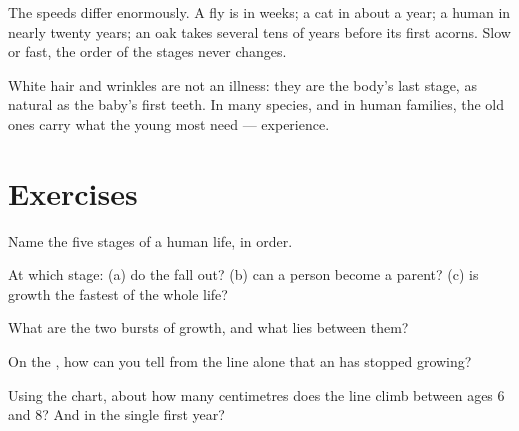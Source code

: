 \begin{example}\label{ex:g3:stages-of-life:speeds}
The speeds differ enormously. A fly is  in weeks; a cat in
about a year; a human in nearly twenty years; an oak takes
several tens of years before its first acorns. Slow or fast, the
order of the stages never changes.
\end{example}

\begin{remark}\label{rem:g3:stages-of-life:oldage}
White hair and wrinkles are not an illness: they are the body's
last stage, as natural as the baby's first teeth. In many
species, and in human families, the old ones carry what the
young most need --- experience.
\end{remark}

\section{Exercises}

\begin{exercise}[$\star$]\label{exo:g3:stages-of-life:1}
Name the five stages of a human life, in order.
\end{exercise}

\begin{exercise}[$\star$]\label{exo:g3:stages-of-life:2}
At which stage: (a) do the  fall out? (b) can a person
become a parent? (c) is growth the fastest of the whole life?
\end{exercise}

\begin{exercise}[$\star$]\label{exo:g3:stages-of-life:3}
What are the two bursts of growth, and what lies between them?
\end{exercise}

\begin{exercise}[$\star$]\label{exo:g3:stages-of-life:4}
On the , how can you tell from the line alone that an
 has stopped growing?
\end{exercise}

\begin{exercise}[$\star$]\label{exo:g3:stages-of-life:5}
Using the chart, about how many centimetres does the line climb
between ages $6$ and $8$? And in the single first year?
\end{exercise}

